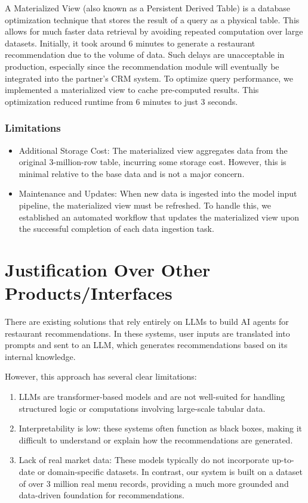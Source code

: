 \documentclass[
  11pt,
  a4paper,
  DIV=11,
  numbers=noendperiod]{scrartcl}
\providecommand{\tightlist}{%
  \setlength{\itemsep}{0pt}\setlength{\parskip}{0pt}}\usepackage{longtable,booktabs,array}
\begin{document}
A Materialized View (also known as a Persistent Derived Table) is a
database optimization technique that stores the result of a query as a
physical table. This allows for much faster data retrieval by avoiding
repeated computation over large datasets. Initially, it took around 6
minutes to generate a restaurant recommendation due to the volume of
data. Such delays are unacceptable in production, especially since the
recommendation module will eventually be integrated into the partner's
CRM system. To optimize query performance, we implemented a materialized
view to cache pre-computed results. This optimization reduced runtime
from 6 minutes to just 3 seconds.

\subsubsection{Limitations}\label{limitations}

\begin{itemize}
\tightlist
\item
  Additional Storage Cost: The materialized view aggregates data from
  the original 3-million-row table, incurring some storage cost.
  However, this is minimal relative to the base data and is not a major
  concern.
\item
  Maintenance and Updates: When new data is ingested into the model
  input pipeline, the materialized view must be refreshed. To handle
  this, we established an automated workflow that updates the
  materialized view upon the successful completion of each data
  ingestion task.
\end{itemize}

\section{Justification Over Other
Products/Interfaces}\label{justification-over-other-productsinterfaces}

There are existing solutions that rely entirely on LLMs to build AI
agents for restaurant recommendations. In these systems, user inputs are
translated into prompts and sent to an LLM, which generates
recommendations based on its internal knowledge.

However, this approach has several clear limitations:

\begin{enumerate}
\def\labelenumi{\arabic{enumi}.}
\tightlist
\item
  LLMs are transformer-based models and are not well-suited for handling
  structured logic or computations involving large-scale tabular data.
\item
  Interpretability is low: these systems often function as black boxes,
  making it difficult to understand or explain how the recommendations
  are generated.
\item
  Lack of real market data: These models typically do not incorporate
  up-to-date or domain-specific datasets. In contrast, our system is
  built on a dataset of over 3 million real menu records, providing a
  much more grounded and data-driven foundation for recommendations.
\end{enumerate}
\end{document}
